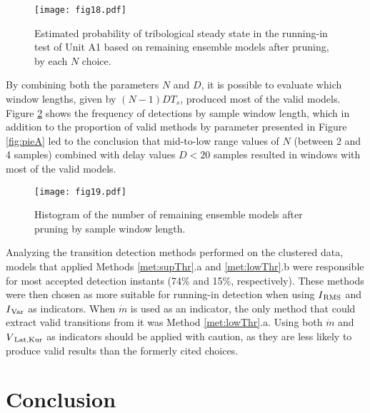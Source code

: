 \documentclass[preprint,11pt,number]{elsarticle}
\begin{document}
\begin{figure}[htb]
\begin{center}
\texttt{[image: fig18.pdf]}    %
\caption{Estimated probability of tribological steady state in the running-in test of Unit A1 based on remaining ensemble models after pruning, by each $N$ choice.} 
\label{fig:CDF_N}
\end{center}
\end{figure}

By combining both the parameters $N$ and $D$, it is possible to evaluate which window lengths, given by $(N-1)DT_s$, produced most of the valid models. Figure \ref{fig:hist_WindowLength} shows the frequency of detections by sample window length, which in addition to the proportion of valid methods by parameter presented in Figure \ref{fig:pieA} led to the conclusion that mid-to-low range values of $N$ (between 2 and 4 samples) combined with delay values $D<20$ samples resulted in windows with most of the valid models. 

\begin{figure}[htb]
\begin{center}
\texttt{[image: fig19.pdf]}    %
\caption{Histogram of the number of remaining ensemble models after pruning by sample window length.} 
\label{fig:hist_WindowLength}
\end{center}
\end{figure}

Analyzing the transition detection methods performed on the clustered data, models that applied Methods \ref{met:supThr}.a and \ref{met:lowThr}.b were responsible for most accepted detection instants (74\% and 15\%, respectively). These methods were then chosen as more suitable for running-in detection when using $I\textsubscript{RMS}$ and $I\textsubscript{Var}$ as indicators. When $\dot{m}$ is used as an indicator, the only method that could extract valid transitions from it was Method \ref{met:lowThr}.a. Using both $\dot{m}$ and $V\textsubscript{Lat,Kur}$ as indicators should be applied with caution, as they are less likely to produce valid results than the formerly cited choices.

\section{Conclusion}\label{sec:Conclusion}
\end{document}
